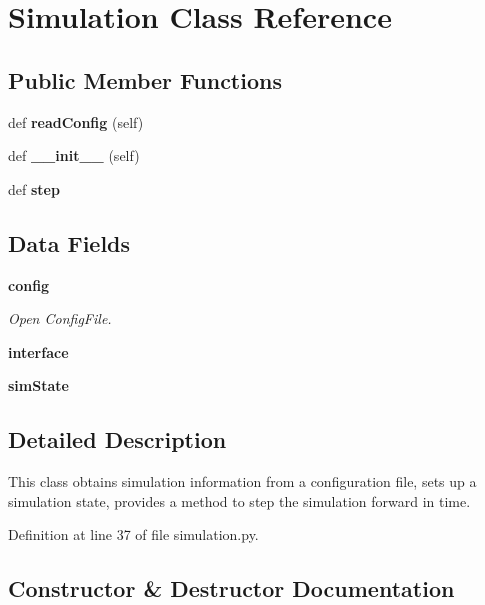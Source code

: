 \section{Simulation Class Reference}
\label{classsims_1_1tcptank_1_1simulation_1_1_simulation}
\subsection*{Public Member Functions}
\begin{DoxyCompactItemize}
\item 
def {\bf read\+Config} (self)
\item 
def {\bf \+\_\+\+\_\+init\+\_\+\+\_\+} (self)
\item 
def {\bf step}
\end{DoxyCompactItemize}
\subsection*{Data Fields}
\begin{DoxyCompactItemize}
\item 
{\bf config}
\begin{DoxyCompactList}\small\item\em Open Config\+File. \end{DoxyCompactList}\item 
{\bf interface}
\item 
{\bf sim\+State}
\end{DoxyCompactItemize}


\subsection{Detailed Description}
\begin{DoxyVerb}This class obtains simulation information from a configuration file,
    sets up a simulation state, provides a method to step the simulation
    forward in time.\end{DoxyVerb}
 

Definition at line 37 of file simulation.\+py.



\subsection{Constructor \& Destructor Documentation}
